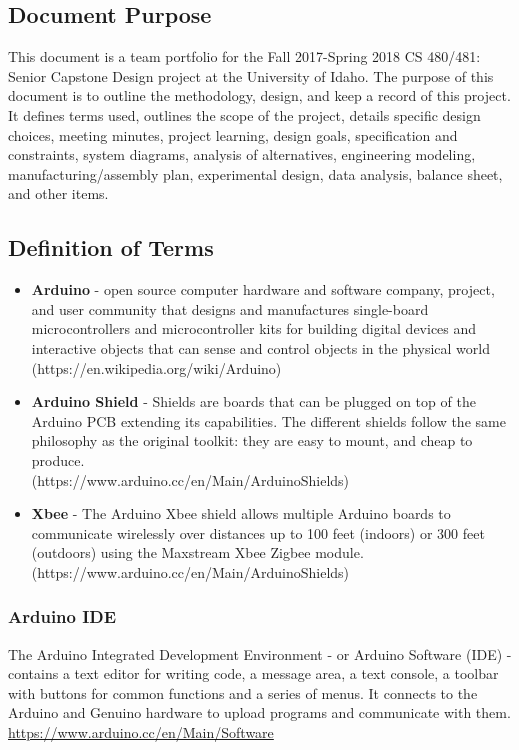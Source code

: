 \documentclass[12pt]{article}
\begin{document}
		\subsection{Document Purpose}
	 		This document is a team portfolio for the Fall 2017-Spring 2018 CS 480/481: Senior Capstone Design project at the University of Idaho. The purpose of this document is to outline the methodology, design, and keep a record of this project. It defines terms used, outlines the scope of the project, details specific design choices, meeting minutes, project learning, design goals, specification and constraints, system diagrams, analysis of alternatives, engineering modeling, manufacturing/assembly plan, experimental design, data analysis, balance sheet, and other items.
		
		\subsection{Definition of Terms}
			\begin{itemize}
				\item \textbf{Arduino} - open source computer hardware and software company, project, and user community that designs and manufactures 		single-board microcontrollers and microcontroller kits for building digital devices and interactive objects that can sense and control objects in the physical world\\ (https://en.wikipedia.org/wiki/Arduino)
				\item \textbf{Arduino Shield} - Shields are boards that can be plugged on top of the Arduino PCB extending its capabilities. The different shields follow the same philosophy as the original toolkit: they are easy to mount, and cheap to produce.\\ (https://www.arduino.cc/en/Main/ArduinoShields)
				\item \textbf{Xbee} - The Arduino Xbee shield allows multiple Arduino boards to communicate wirelessly over distances up to 100 feet (indoors) or 300 feet (outdoors) using the Maxstream Xbee Zigbee module.\\ (https://www.arduino.cc/en/Main/ArduinoShields)		
			\end{itemize}
		
		\subsubsection{Arduino IDE}
		The Arduino Integrated Development Environment - or Arduino Software (IDE) - contains a text editor for writing code, a message area, a text console, a toolbar with buttons for common functions and a series of menus. It connects to the Arduino and Genuino hardware to upload programs and communicate with them. \url{https://www.arduino.cc/en/Main/Software}
		
\end{document}
